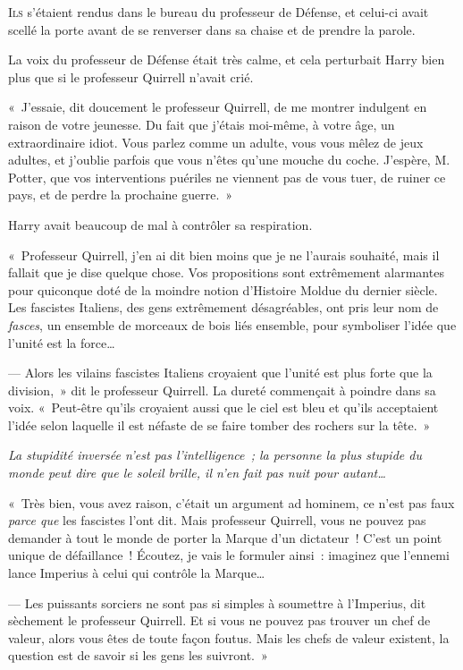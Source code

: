 
\lettrine{I}{ls} s'étaient rendus dans le bureau du professeur de Défense, et celui-ci avait scellé la porte avant de se renverser dans sa chaise et de prendre la parole.

La voix du professeur de Défense était très calme, et cela perturbait Harry bien plus que si le professeur Quirrell n'avait crié.

«~J'essaie, dit doucement le professeur Quirrell, de me montrer indulgent en raison de votre jeunesse.
Du fait que j'étais moi-même, à votre âge, un extraordinaire idiot.
Vous parlez comme un adulte, vous vous mêlez de jeux adultes, et j'oublie parfois que vous n'êtes qu'une mouche du coche.
J'espère, M. Potter, que vos interventions puériles ne viennent pas de vous tuer, de ruiner ce pays, et de perdre la prochaine guerre.~»

Harry avait beaucoup de mal à contrôler sa respiration.

«~Professeur Quirrell, j'en ai dit bien moins que je ne l'aurais souhaité, mais il fallait que je dise quelque chose.
Vos propositions sont extrêmement alarmantes pour quiconque doté de la moindre notion d'Histoire Moldue du dernier siècle.
Les fascistes Italiens, des gens extrêmement désagréables, ont pris leur nom de \emph{fasces}, un ensemble de morceaux de bois liés ensemble, pour symboliser l'idée que l'unité est la force…

--- Alors les vilains fascistes Italiens croyaient que l'unité est plus forte que la division,~» dit le professeur Quirrell.
La dureté commençait à poindre dans sa voix.
«~Peut-être qu'ils croyaient aussi que le ciel est bleu et qu'ils acceptaient l'idée selon laquelle il est néfaste de se faire tomber des rochers sur la tête.~»

\emph{La stupidité inversée n'est pas l'intelligence~; la personne la plus stupide du monde peut dire que le soleil brille, il n'en fait pas nuit pour autant…}

«~Très bien, vous avez raison, c'était un argument ad hominem, ce n'est pas faux \emph{parce que} les fascistes l'ont dit.
Mais professeur Quirrell, vous ne pouvez pas demander à tout le monde de porter la Marque d'un dictateur~!
C'est un point unique de défaillance~!
Écoutez, je vais le formuler ainsi~: imaginez que l'ennemi lance Imperius à celui qui contrôle la Marque…

--- Les puissants sorciers ne sont pas si simples à soumettre à l'Imperius, dit sèchement le professeur Quirrell.
Et si vous ne pouvez pas trouver un chef de valeur, alors vous êtes de toute façon foutus.
Mais les chefs de valeur existent, la question est de savoir si les gens les suivront.~»

